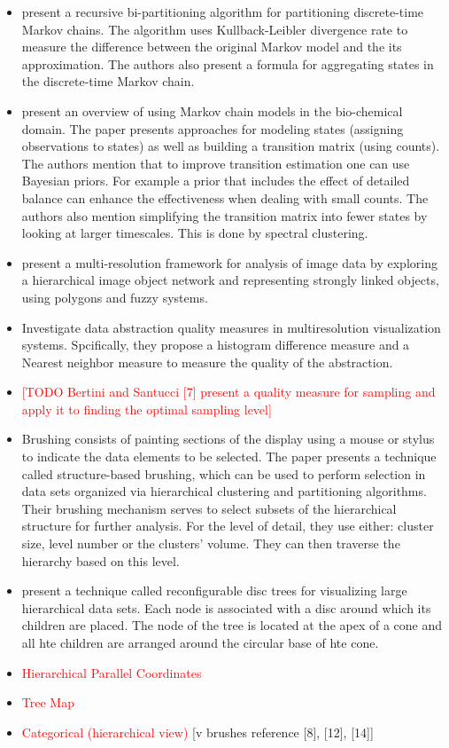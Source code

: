 \begin{itemize}
	\item \cite{5746509} present a recursive bi-partitioning algorithm for partitioning discrete-time Markov chains. The 
	algorithm uses Kullback-Leibler divergence rate to measure the difference between the original Markov
	model and the its approximation. The authors also present a formula for aggregating states in the discrete-time
	Markov chain.
	\item \cite{pande-beauchamp-bowman:2010:methods:markov-model-review} present an overview of using Markov chain models in the bio-chemical domain. The paper
	presents approaches for modeling states (assigning observations to states) as well as building a transition
	matrix (using counts). The authors mention that to improve transition estimation one can use Bayesian priors.
	For example a prior that includes the effect of detailed balance can enhance the effectiveness when dealing with
	small counts. The authors also mention simplifying the transition matrix into fewer states by looking at larger
	timescales. This is done by spectral clustering.
	\item \cite{Benz2004239} present a multi-resolution framework for analysis of image data by exploring a hierarchical
	image object network and representing strongly linked objects, using polygons and fuzzy systems.
	\item \cite{4015421} Investigate data abstraction quality measures in multiresolution visualization systems. Spcifically, they propose
	a histogram difference measure and a Nearest neighbor measure to measure the quality of the abstraction.
	\item \textcolor{red}{[TODO Bertini and Santucci [7] present a quality measure for sampling and apply it to finding the optimal sampling level]}
	\item \cite{Fua:2000:SBM:614278.614457} Brushing consists of painting sections of the display using a 
	mouse or stylus to indicate the data elements to be selected. The paper presents a technique called
	structure-based brushing, which can be used to perform selection in data sets organized via hierarchical clustering
	and partitioning algorithms. Their brushing mechanism serves to select subsets of the hierarchical structure
	for further analysis. For the level of detail, they use either: cluster size, level number or the clusters' volume.
	They can then traverse the hierarchy based on this level.
	\item \cite{729555} present a technique called
	reconfigurable disc trees for visualizing large hierarchical data sets. Each node is associated with a disc around which 
	its children are placed. The node of the tree is located at the apex of a cone and all hte children are arranged around
	the circular base of hte cone.
	\item \textcolor{red}{Hierarchical Parallel Coordinates}
	\item \textcolor{red}{Tree Map}
	\item \textcolor{red}{Categorical (hierarchical view)} [v brushes reference [8], [12], [14]]
\end{itemize}